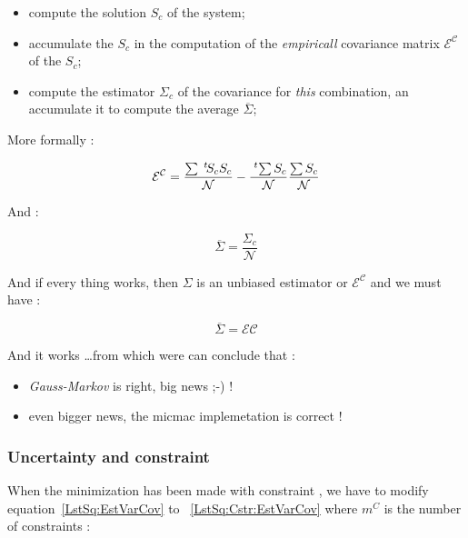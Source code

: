 \begin{itemize}
     \item compute the solution $S_c$  of the system;

     \item accumulate the $S_c$ in the computation of the \emph{empiricall} covariance matrix $\mathcal{E^C}$ of the $S_c$;

     \item compute the estimator $\Sigma_c $ of the covariance for \emph{this} combination, an accumulate it
	     to compute the average  $\overline \Sigma$;
\end{itemize}

More formally :

\begin{equation}
	\mathcal{E^C} =  \frac{\sum \; ^{t} \! S_c S_c }{\mathcal{N}} -   \frac{\; ^{t} \! \sum S_c}{\mathcal{N}}  \frac{\sum S_c}{\mathcal{N}}
\end{equation}

And  :

\begin{equation}
	\overline \Sigma =  \frac{\Sigma_c }{\mathcal{N}} 
\end{equation}


And if every thing works, then $ \Sigma$ is an unbiased estimator or $ \mathcal{E^C} $ and we must have :

\begin{equation}
	\overline \Sigma   = \mathcal{EC}
\end{equation}

And it works \dots from which were can conclude that :

\begin{itemize}
     \item \emph{Gauss-Markov} is right, big news ;-) !
    \item even bigger news, the micmac implemetation is correct !
\end{itemize}

\subsubsection{Uncertainty and constraint}

When the minimization has been made with  constraint , we have to modify equation~\ref{LstSq:EstVarCov}
to ~\ref{LstSq:Cstr:EstVarCov} where $m^C$ is the number of constraints :



